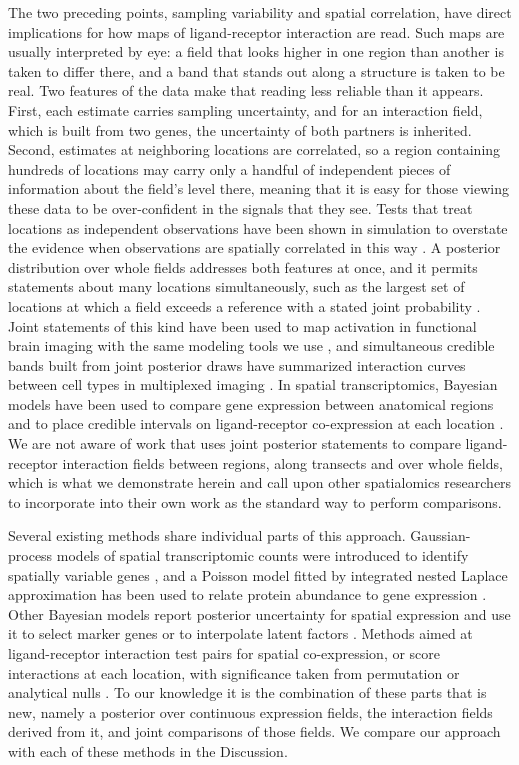 \documentclass[10pt,letterpaper]{article}
\begin{document}
The two preceding points, sampling variability and spatial correlation, have direct implications for how maps of ligand-receptor interaction are read. Such maps are usually interpreted by eye: a field that looks higher in one region than another is taken to differ there, and a band that stands out along a structure is taken to be real. Two features of the data make that reading less reliable than it appears. First, each estimate carries sampling uncertainty, and for an interaction field, which is built from two genes, the uncertainty of both partners is inherited. Second, estimates at neighboring locations are correlated, so a region containing hundreds of locations may carry only a handful of independent pieces of information about the field's level there, meaning that it is easy for those viewing these data to be over-confident in the signals that they see. Tests that treat locations as independent observations have been shown in simulation to overstate the evidence when observations are spatially correlated in this way \cite{vasconcelos2026smide,seal2026spacebf}. A posterior distribution over whole fields addresses both features at once, and it permits statements about many locations simultaneously, such as the largest set of locations at which a field exceeds a reference with a stated joint probability \cite{bolin2015excursion}. Joint statements of this kind have been used to map activation in functional brain imaging with the same modeling tools we use \cite{mejia2020bayesian}, and simultaneous credible bands built from joint posterior draws have summarized interaction curves between cell types in multiplexed imaging \cite{eliason2026shade}. In spatial transcriptomics, Bayesian models have been used to compare gene expression between anatomical regions \cite{aijo2019splotch} and to place credible intervals on ligand-receptor co-expression at each location \cite{seal2026spacebf}. We are not aware of work that uses joint posterior statements to compare ligand-receptor interaction fields between regions, along transects and over whole fields, which is what we demonstrate herein and call upon other spatialomics researchers to incorporate into their own work as the standard way to perform comparisons.

Several existing methods share individual parts of this approach. Gaussian-process models of spatial transcriptomic counts were introduced to identify spatially variable genes \cite{Svensson2018,Li2021}, and a Poisson model fitted by integrated nested Laplace approximation has been used to relate protein abundance to gene expression \cite{arnroth2025inlaomics}. Other Bayesian models report posterior uncertainty for spatial expression and use it to select marker genes or to interpolate latent factors \cite{zhang2023bayestme,velten2022mefisto}. Methods aimed at ligand-receptor interaction test pairs for spatial co-expression, or score interactions at each location, with significance taken from permutation or analytical nulls \cite{Li2023,Liu2026}. To our knowledge it is the combination of these parts that is new, namely a posterior over continuous expression fields, the interaction fields derived from it, and joint comparisons of those fields. We compare our approach with each of these methods in the Discussion.
\end{document}
